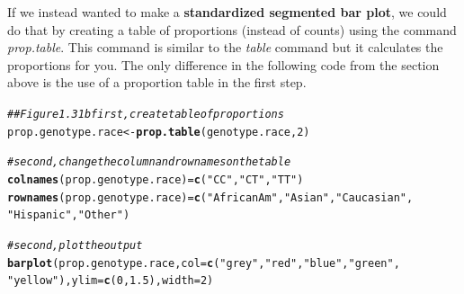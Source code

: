 \documentclass[11pt]{article}\usepackage[]{graphicx}\usepackage[]{color}
\makeatletter
\newcommand{\hlnum}[1]{\textcolor[rgb]{0.686,0.059,0.569}{#1}}%
\newcommand{\hlstr}[1]{\textcolor[rgb]{0.192,0.494,0.8}{#1}}%
\newcommand{\hlcom}[1]{\textcolor[rgb]{0.678,0.584,0.686}{\textit{#1}}}%
\newcommand{\hlstd}[1]{\textcolor[rgb]{0.345,0.345,0.345}{#1}}%
\newcommand{\hlkwb}[1]{\textcolor[rgb]{0.69,0.353,0.396}{#1}}%
\newcommand{\hlkwc}[1]{\textcolor[rgb]{0.333,0.667,0.333}{#1}}%
\newcommand{\hlkwd}[1]{\textcolor[rgb]{0.737,0.353,0.396}{\textbf{#1}}}%
\newenvironment{kframe}{%
 \def\at@end@of@kframe{}%
 \ifinner\ifhmode%
  \def\at@end@of@kframe{\end{minipage}}%
  \begin{minipage}{\columnwidth}%
 \fi\fi%
 \def\FrameCommand##1{\hskip\@totalleftmargin \hskip-\fboxsep
 \colorbox{shadecolor}{##1}\hskip-\fboxsep
     \hskip-\linewidth \hskip-\@totalleftmargin \hskip\columnwidth}%
 \MakeFramed {\advance\hsize-\width
   \@totalleftmargin\z@ \linewidth\hsize
   \@setminipage}}%
 {\par\unskip\endMakeFramed%
 \at@end@of@kframe}
\newenvironment{knitrout}{}{} %
\makeatother
\begin{document}
\begin{knitrout}
\end{knitrout}

If we instead wanted to make a \textbf{standardized segmented bar plot}, we could do that by creating a table of proportions (instead of counts) using the command \textit{prop.table}.  This command is similar to the \textit{table} command but it calculates the proportions for you.  The only difference in the following code from the section above is the use of a proportion table in the first step.
\begin{knitrout}
\color{fgcolor}\begin{kframe}
\begin{alltt}
\hlcom{## Figure 1.31b first, create table of proportions}
\hlstd{prop.genotype.race} \hlkwb{<-} \hlkwd{prop.table}\hlstd{(genotype.race,} \hlnum{2}\hlstd{)}

\hlcom{# second, change the column and row names on the table}
\hlkwd{colnames}\hlstd{(prop.genotype.race)} \hlkwb{=} \hlkwd{c}\hlstd{(}\hlstr{"CC"}\hlstd{,} \hlstr{"CT"}\hlstd{,} \hlstr{"TT"}\hlstd{)}
\hlkwd{rownames}\hlstd{(prop.genotype.race)} \hlkwb{=} \hlkwd{c}\hlstd{(}\hlstr{"African Am"}\hlstd{,} \hlstr{"Asian"}\hlstd{,} \hlstr{"Caucasian"}\hlstd{,}
    \hlstr{"Hispanic"}\hlstd{,} \hlstr{"Other"}\hlstd{)}

\hlcom{# second, plot the output}
\hlkwd{barplot}\hlstd{(prop.genotype.race,} \hlkwc{col} \hlstd{=} \hlkwd{c}\hlstd{(}\hlstr{"grey"}\hlstd{,} \hlstr{"red"}\hlstd{,} \hlstr{"blue"}\hlstd{,} \hlstr{"green"}\hlstd{,}
    \hlstr{"yellow"}\hlstd{),} \hlkwc{ylim} \hlstd{=} \hlkwd{c}\hlstd{(}\hlnum{0}\hlstd{,} \hlnum{1.5}\hlstd{),} \hlkwc{width} \hlstd{=} \hlnum{2}\hlstd{)}


\end{alltt}
\end{kframe}
\end{knitrout}
\end{document}
